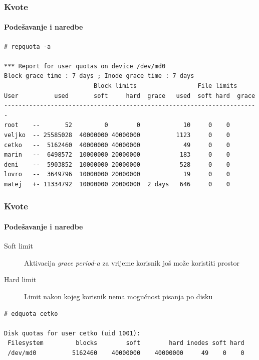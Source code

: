 \documentclass[t]{beamer}
\begin{document}
\begin{frame}[fragile]
	\frametitle{Kvote}
	\framesubtitle{Podešavanje i naredbe}
	{\footnotesize \begin{verbatim}
# repquota -a

*** Report for user quotas on device /dev/md0
Block grace time : 7 days ; Inode grace time : 7 days
                         Block limits                 File limits
User          used       soft     hard  grace   used  soft hard  grace
-----------------------------------------------------------------------
root    --       52         0        0            10     0    0
veljko  -- 25585028  40000000 40000000          1123     0    0
cetko   --  5162460  40000000 40000000            49     0    0
marin   --  6498572  10000000 20000000           183     0    0
deni    --  5903852  10000000 20000000           528     0    0
lovro   --  3649796  10000000 20000000            19     0    0
matej   +- 11334792  10000000 20000000  2 days   646     0    0
	\end{verbatim}}
\end{frame}

\begin{frame}[fragile]
	\frametitle{Kvote}
	\framesubtitle{Podešavanje i naredbe}
	\begin{description}
		\item[Soft limit] Aktivacija \emph{grace period-a} za vrijeme korisnik još može koristiti prostor
		\item[Hard limit] Limit nakon kojeg korisnik nema mogućnost pisanja po disku
	\end{description}
	\vspace{1em}
	{\footnotesize \begin{verbatim}
# edquota cetko

Disk quotas for user cetko (uid 1001):
 Filesystem         blocks        soft        hard inodes soft hard
 /dev/md0          5162460    40000000    40000000     49    0    0
	\end{verbatim}}
\end{frame}
\end{document}
